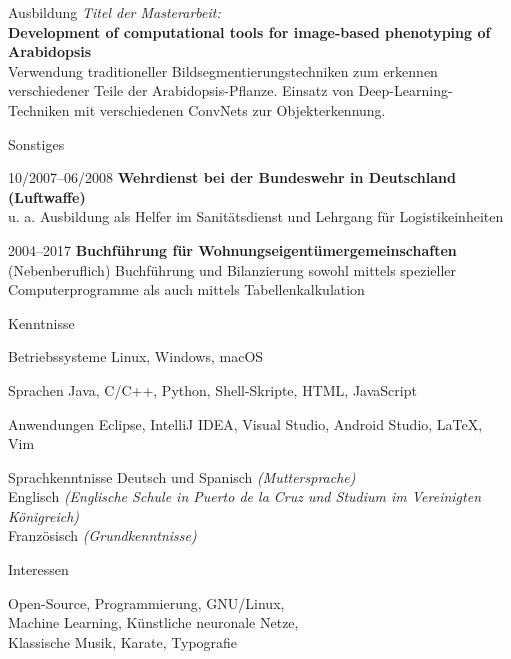 \documentclass[12pt,a4paper,oneside,final]{scrartcl}
\begin{document}
\begin{cv}
\begin{cvlist}{Ausbildung}
            \textit{Titel der Masterarbeit:}\\[0.5em]
            \textbf{Development of computational tools for image-based phenotyping of Arabidopsis}\\
            Verwendung traditioneller Bildsegmentierungstechniken zum erkennen verschiedener Teile der Arabidopsis-Pflanze. Einsatz von Deep-Learning-Techniken mit verschiedenen ConvNets zur Objekterkennung.

        \sepspace
    \end{cvlist}

    \begin{cvlist}{Sonstiges}
        \item[10/2007--06/2008] \textbf{Wehrdienst bei der Bundeswehr in Deutschland (Luftwaffe)}\\
            u. a. Ausbildung als Helfer im Sanitätsdienst und Lehrgang für Logistikeinheiten
        \item[2004--2017] \textbf{Buchführung für Wohnungseigentümergemeinschaften}\\
            (Nebenberuflich) Buchführung und Bilanzierung sowohl mittels spezieller Computerprogramme als auch mittels Tabellenkalkulation

        \sepspace
    \end{cvlist}

    \begin{cvlist}{Kenntnisse}
        \item[Betriebssysteme] Linux, Windows, macOS
        \item[Sprachen] Java, C/C++, Python, Shell-Skripte, HTML, JavaScript
        \item[Anwendungen] Eclipse, IntelliJ IDEA, Visual Studio, Android Studio, LaTeX, Vim
        \item[Sprachkenntnisse] Deutsch und Spanisch \textit{(Muttersprache)}\\
            Englisch \textit{(Englische Schule in Puerto de la Cruz und Studium im Vereinigten Königreich)}\\
            Französisch \textit{(Grundkenntnisse)}

        \sepspace
    \end{cvlist}

    \begin{cvlist}{Interessen}
        \item Open-Source, Programmierung, GNU/Linux,\\
            Machine Learning, Künstliche neuronale Netze,\\
            Klassische Musik, Karate, Typografie
    \end{cvlist}

    \date{15.~März~2018}

\end{cv}
\end{document}
